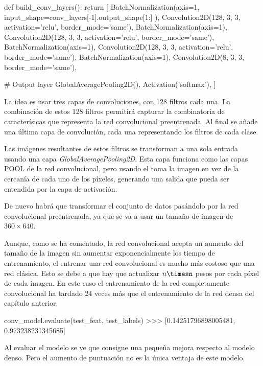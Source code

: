 \begin{python}
def build_conv_layers():
    return [
        BatchNormalization(axis=1, 
            input_shape=conv_layers[-1].output_shape[1:]
        ),
        Convolution2D(128, 3, 3, activation='relu', border_mode='same'),
        BatchNormalization(axis=1),
        Convolution2D(128, 3, 3, activation='relu', border_mode='same'),
        BatchNormalization(axis=1),
        Convolution2D(128, 3, 3, activation='relu', border_mode='same'),
        BatchNormalization(axis=1),
        Convolution2D(8, 3, 3, border_mode='same'),
        
        # Output layer
        GlobalAveragePooling2D(),
        Activation('softmax'),
    ]
\end{python}

La idea es usar tres capas de convoluciones, con 128 filtros cada una. La combinación de estos 128 filtros permitirá capturar la combinatoria de caracterísicas que representa la red convolucional preentrenada. Al final se añade una última capa de convolución, cada una representando los filtros de cada clase.

Las imágenes resultantes de estos filtros se transforman a una sola entrada usando una capa \textit{GlobalAveragePooling2D}. Esta capa funciona como las capas POOL de la red convolucional, pero usando el toma la imagen en vez de la cercanía de cada uno de los píxeles, generando una salida que pueda ser entendida por la capa de activación.

De nuevo habrá que transformar el conjunto de datos pasándolo por la red convolucional preentrenada, ya que se va a usar un tamaño de imagen de $360\times640$.

Aunque, como se ha comentado, la red convolucional acepta un aumento del tamaño de la imagen sin aumentar exponencialmente los tiempo de entrenamiento, el entrenar una red convolucional es mucho más costoso que una red clásica. Esto se debe a que hay que actualizar $n\timesn$ pesos por cada píxel de cada imagen. En este caso el entrenamiento de la red completamente convolucional ha tardado 24 veces más que el entrenamiento de la red densa del capítulo anterior.

\begin{python}
conv_model.evaluate(test_feat, test_labels)
>>> [0.14251796898005481, 0.973238231345685]
\end{python}

Al evaluar el modelo se ve que consigue una pequeña mejora respecto al modelo denso. Pero el aumento de puntuación no es la única ventaja de este modelo.

